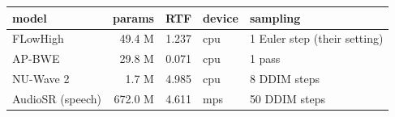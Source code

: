 \begin{tabular}{lrrll}
\toprule
model & params & RTF & device & sampling \\
\midrule
FLowHigh & 49.4 M & 1.237 & cpu & 1 Euler step (their setting) \\
AP-BWE & 29.8 M & 0.071 & cpu & 1 pass \\
NU-Wave 2 & 1.7 M & 4.985 & cpu & 8 DDIM steps \\
AudioSR (speech) & 672.0 M & 4.611 & mps & 50 DDIM steps \\
\bottomrule
\end{tabular}
